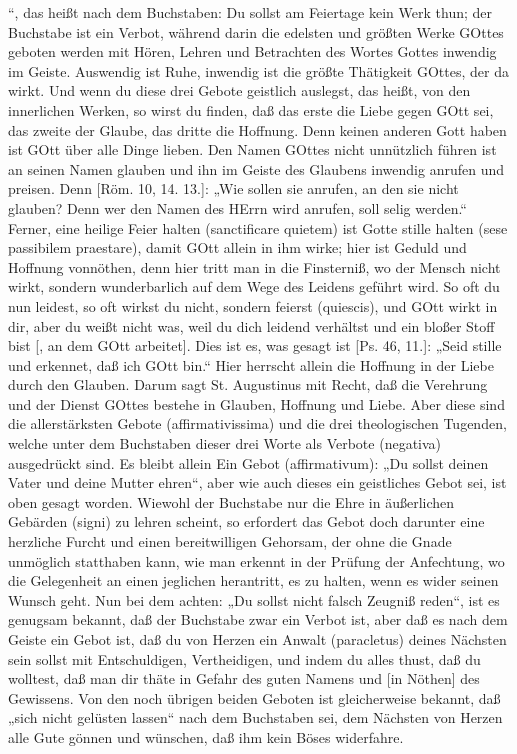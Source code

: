 “, das heißt nach dem Buchstaben: Du sollst am Feiertage kein Werk thun; der Buchstabe ist ein Verbot, während darin die edelsten und größten Werke GOttes geboten werden mit Hören, Lehren und Betrachten des Wortes Gottes inwendig im Geiste. Auswendig ist Ruhe, inwendig ist die größte Thätigkeit GOttes, der da wirkt. Und wenn du diese drei Gebote geistlich auslegst, das heißt, von den innerlichen Werken, so wirst du finden, daß das erste die Liebe gegen GOtt sei, das zweite der Glaube, das dritte die Hoffnung. Denn keinen anderen Gott haben ist GOtt über alle Dinge lieben. Den Namen GOttes nicht unnützlich führen ist an seinen Namen glauben und ihn im Geiste des Glaubens inwendig anrufen und preisen. Denn [Röm. 10, 14. 13.]: „Wie sollen sie anrufen, an den sie nicht glauben? Denn wer den Namen des HErrn wird anrufen, soll selig werden.“ Ferner, eine heilige Feier halten (sanctificare quietem) ist Gotte stille halten (sese passibilem praestare), damit GOtt allein in ihm wirke; hier ist Geduld und Hoffnung vonnöthen, denn hier tritt man in die Finsterniß, wo der Mensch nicht wirkt, sondern wunderbarlich auf dem Wege des Leidens geführt wird. So oft du nun leidest, so oft wirkst du nicht, sondern feierst (quiescis), und GOtt wirkt in dir, aber du weißt nicht was, weil du dich leidend verhältst und ein bloßer Stoff bist [, an dem GOtt arbeitet]. Dies ist es, was gesagt ist [Ps. 46, 11.]: „Seid stille und erkennet, daß ich GOtt bin.“ Hier herrscht allein die Hoffnung in der Liebe durch den Glauben. Darum sagt St. Augustinus mit Recht, daß die Verehrung und der Dienst GOttes bestehe in Glauben, Hoffnung und Liebe. Aber diese sind die allerstärksten Gebote (affirmativissima) und die drei theologischen Tugenden, welche unter dem Buchstaben dieser drei Worte als Verbote (negativa) ausgedrückt sind. Es bleibt allein Ein Gebot (affirmativum): „Du sollst deinen Vater und deine Mutter ehren“, aber wie auch dieses ein geistliches Gebot sei, ist oben gesagt worden. Wiewohl der Buchstabe nur die Ehre in äußerlichen Gebärden (signi) zu lehren scheint, so erfordert das Gebot doch darunter eine herzliche Furcht und einen bereitwilligen Gehorsam, der ohne die Gnade unmöglich statthaben kann, wie man erkennt in der Prüfung der Anfechtung, wo die Gelegenheit an einen jeglichen herantritt, es zu halten, wenn es wider seinen Wunsch geht. Nun bei dem achten: „Du sollst nicht falsch Zeugniß reden“, ist es genugsam bekannt, daß der Buchstabe zwar ein Verbot ist, aber daß es nach dem Geiste ein Gebot ist, daß du von Herzen ein Anwalt (paracletus) deines Nächsten sein sollst mit Entschuldigen, Vertheidigen, und indem du alles thust, daß du wolltest, daß man dir thäte in Gefahr des guten Namens und [in Nöthen] des Gewissens. Von den noch übrigen beiden Geboten ist gleicherweise bekannt, daß „sich nicht gelüsten lassen“ nach dem Buchstaben sei, dem Nächsten von Herzen alle Gute gönnen und wünschen, daß ihm kein Böses widerfahre.

